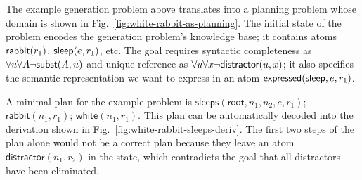 The example generation problem above translates into a planning
problem whose domain is shown in
Fig.~\ref{fig:white-rabbit-as-planning}. The initial state of the
problem encodes the generation problem's knowledge base; it contains
atoms $\mathsf{rabbit}(r_1)$, $\mathsf{sleep}(e,r_1)$, etc.  The goal requires
syntactic completeness as $\forall u \forall A \neg \mathsf{subst}(A,u)$
and unique reference as $\forall u \forall x \neg
\mathsf{distractor}(u,x)$; it also specifies the semantic representation we
want to express in an atom $\mathsf{expressed}(\mathsf{sleep},e,r_1)$.

A minimal plan for the example problem is
$\mathsf{sleeps}(\mathsf{root}, n_1, n_2, e, r_1)$;
$\mathsf{rabbit}(n_1, r_1)$; $\mathsf{white}(n_1, r_1)$. This plan can
be automatically decoded into the derivation shown in
Fig.~\ref{fig:white-rabbit-sleeps-deriv}.  The first two steps of the
plan alone would not be a correct plan because they leave an atom
$\mathsf{distractor}(n_1, r_2)$ in the state, which contradicts the
goal that all distractors have been eliminated.






